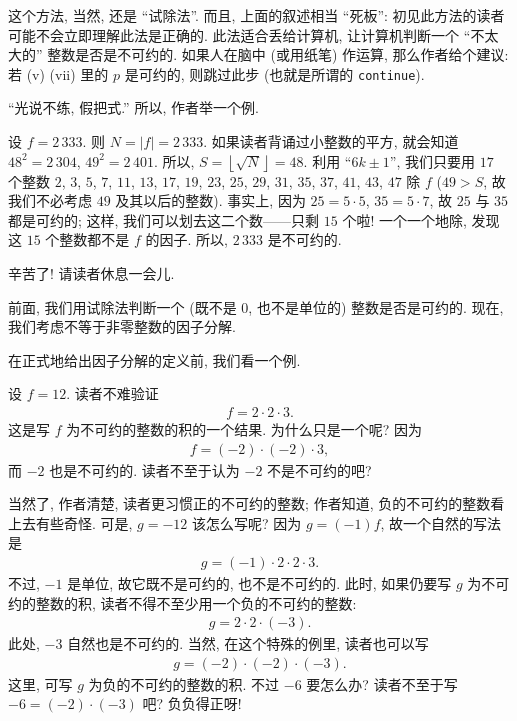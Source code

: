 这个方法, 当然, 还是 ``试除法''. 而且, 上面的叙述相当 ``死板'': 初见此方法的读者可能不会立即理解此法是正确的. 此法适合丢给计算机, 让计算机判断一个 ``不太大的'' 整数是否是不可约的. 如果人在脑中 (或用纸笔) 作运算, 那么作者给个建议: 若 (v) (vii) 里的 $p$ 是可约的, 则跳过此步 (也就是所谓的 \texttt{continue}).

``光说不练, 假把式.'' 所以, 作者举一个例.

\begin{example}
    设 $f = 2\,333$. 则 $N = |f| = 2\,333$. 如果读者背诵过小整数的平方, 就会知道 $48^2 = 2\,304$, $49^2 = 2\,401$. 所以, $S = \left \lfloor \sqrt{N} \right \rfloor = 48$. 利用 ``$6k \pm 1$'', 我们只要用 $17$ 个整数 $2$, $3$, $5$, $7$, $11$, $13$, $17$, $19$, $23$, $25$, $29$, $31$, $35$, $37$, $41$, $43$, $47$ 除 $f$ ($49 > S$, 故我们不必考虑 $49$ 及其以后的整数). 事实上, 因为 $25 = 5 \cdot 5$, $35 = 5 \cdot 7$, 故 $25$ 与 $35$ 都是可约的; 这样, 我们可以划去这二个数——只剩 $15$ 个啦! 一个一个地除, 发现这 $15$ 个整数都不是 $f$ 的因子. 所以, $2\,333$ 是不可约的.
\end{example}

辛苦了! 请读者休息一会儿.

\myLine

前面, 我们用试除法判断一个 (既不是 $0$, 也不是单位的) 整数是否是可约的. 现在, 我们考虑不等于非零整数的因子分解.

在正式地给出因子分解的定义前, 我们看一个例.

\begin{example}
    设 $f = 12$. 读者不难验证
    \begin{align*}
        f = 2 \cdot 2 \cdot 3.
    \end{align*}
    这是写 $f$ 为不可约的整数的积的一个结果. 为什么只是一个呢? 因为
    \begin{align*}
        f = (-2) \cdot (-2) \cdot 3,
    \end{align*}
    而 $-2$ 也是不可约的. 读者不至于认为 $-2$ 不是不可约的吧?

    当然了, 作者清楚, 读者更习惯正的不可约的整数; 作者知道, 负的不可约的整数看上去有些奇怪. 可是, $g = -12$ 该怎么写呢? 因为 $g = (-1)f$, 故一个自然的写法是
    \begin{align*}
        g = (-1) \cdot 2 \cdot 2 \cdot 3.
    \end{align*}
    不过, $-1$ 是单位, 故它既不是可约的, 也不是不可约的. 此时, 如果仍要写 $g$ 为不可约的整数的积, 读者不得不至少用一个负的不可约的整数:
    \begin{align*}
        g = 2 \cdot 2 \cdot (-3).
    \end{align*}
    此处, $-3$ 自然也是不可约的. 当然, 在这个特殊的例里, 读者也可以写
    \begin{align*}
        g = (-2) \cdot (-2) \cdot (-3).
    \end{align*}
    这里, 可写 $g$ 为负的不可约的整数的积. 不过 $-6$ 要怎么办? 读者不至于写 $-6 = (-2) \cdot (-3)$ 吧? 负负得正呀!
\end{example}

